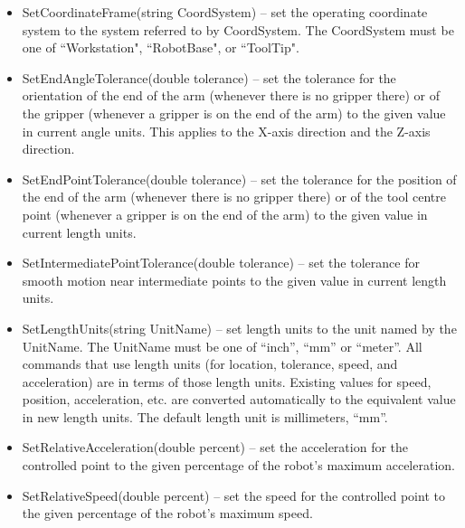 \begin{itemize}
\item \sf SetCoordinateFrame(string CoordSystem) \rm -- set the
operating coordinate system to the system referred to by
\sf CoordSystem\rm. The \sf CoordSystem \rm must be one of
``Workstation", ``RobotBase", or ``ToolTip".\\

\item \sf SetEndAngleTolerance(double tolerance) \rm -- set the tolerance
  for the orientation of the end of the arm (whenever there is no gripper
  there) or of the gripper (whenever a gripper is on the end of the arm) to
  the given value in current angle units. This applies to the X-axis direction
and the Z-axis direction.\\

\item \sf SetEndPointTolerance(double tolerance) \rm -- set the tolerance
  for the position of the end of the arm (whenever there is no gripper
  there) or of the tool centre point (whenever a gripper is on the end of
  the arm) to the given value in current length units.\\

\item \sf SetIntermediatePointTolerance(double tolerance) \rm -- set the
  tolerance for smooth motion near intermediate points to the given value
  in current length units.\\

\item \sf SetLengthUnits(string UnitName) \rm -- set length units to the
  unit named by the \sf UnitName\rm.  The \sf UnitName \rm must be one of
  ``inch'', ``mm'' or ``meter''. All commands that use length units (for
  location, tolerance, speed, and acceleration) are in terms of those
  length units. Existing values for speed, position, acceleration, etc. are
  converted automatically to the equivalent value in new length units. The
  default length unit is millimeters, ``mm''.\\

\item \sf SetRelativeAcceleration(double percent) \rm -- set the
  acceleration for the controlled point to the given percentage of the
  robot's maximum acceleration.\\

\item \sf SetRelativeSpeed(double percent) \rm -- set the speed for the
  controlled point to the given percentage of the robot's maximum speed.\\


\end{itemize}
